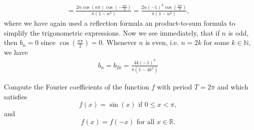 \documentclass[11pt]{article}
\begin{document}
\begin{solution}
\begin{itemize}
\begin{align*}
        = \frac{2 n \cos(n \pi) \cos(- \frac{n \pi}{2})}{\pi ( 1 - n^2)} = \frac{2 n (-1)^n \cos(\frac{n \pi}{2})}{\pi ( 1 - n^2)},
    \end{align*}
    where we have again used a reflection formula an product-to-sum formula to simplify the trigonometric expressions. 
    Now we see immediately, that if $n$ is odd, then $b_n = 0$ since $\cos(\frac{n \pi}{2}) = 0$.
    Whenever $n$ is even, i.e. $n= 2k$ for some $k \in \mathbb N$, we have
    \begin{align*}
        b_n = b_{2k} = \frac{4 k (-1)^k}{\pi (1 - 4 k^2)}
    \end{align*}
\end{itemize}
\end{solution}


\begin{exercise}
     Compute the Fourier coefficients of the function $f$ with period $T = 2\pi$ and which satisfies 
     \[
        f(x) = \sin(x) \text{ if } 0 \leq x  < \pi,
     \]
     and 
     \[
        f(x) = f(-x) \text{ for all } x \in \mathbb R.
     \]
\end{exercise}
\end{document}
